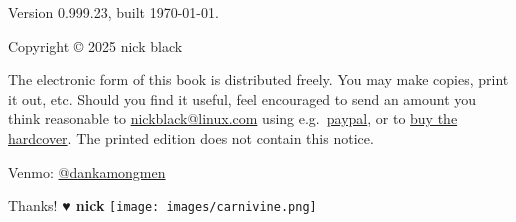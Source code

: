 \clearpage
Version 0.999.23, built \today.

Copyright © 2025 nick black

\bigskip
The electronic form of this book is distributed freely.
You may make copies, print it out, etc.
Should you find it useful, feel encouraged to send an amount you think reasonable to
  \href{mailto:nickblack@linux.com}{nickblack@linux.com} using
  e.g.\ \href{https://paypal.me/dankamongmen}{paypal},
  or to \href{https://goldandappelpub.com/pgo-quantitative.html}{buy the hardcover}.
The printed edition does not contain this notice.

\bigskip
Venmo: \href{https://venmo.com/?txn=pay&audience=friends&recipients=dankamongmen&amount=10&note=pgoquant}{@dankamongmen}

\bigskip
Thanks! {\textbf{♥ nick}}
\vfill\texttt{[image: images/carnivine.png]}\vfill
